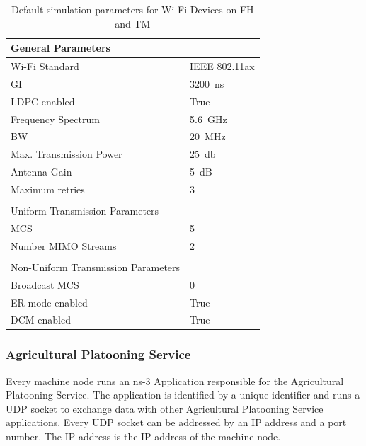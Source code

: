 \begin{table}[H]
   \centering
   \begin{tabular}{p{6cm}p{4cm}}
      General Parameters & \\
      \midrule
      Wi-Fi Standard & IEEE 802.11ax\\
      \ac{GI} & \SI{3200}{\nano\second}\\
      \ac{LDPC} enabled & True\\
      Frequency Spectrum & \SI{5.6}{\giga\hertz}\\
      \ac{BW} & \SI{20}{\mega\hertz}\\
      Max. Transmission Power & \SI{25}{\decibel}\\
      Antenna Gain & \SI{5}{\dB}\\
      Maximum retries & \num{3}\\
       & \\
      Uniform Transmission Parameters & \\
      \midrule
      \ac{MCS} & \num{5}\\
      Number \ac{MIMO} Streams & \num{2}\\
       & \\
      Non-Uniform Transmission Parameters & \\
      \midrule
      Broadcast \ac{MCS} & \num{0}\\
      \ac{ER} mode enabled & True\\
      \ac{DCM} enabled & True\\
   \end{tabular}
   \caption{Default simulation parameters for Wi-Fi Devices on \acf{FH} and \acf{TM}}
   \label{tab:SimulationParametersWiFi}
\end{table}

\subsubsection*{Agricultural Platooning Service}
Every machine node runs an ns-3 Application responsible for the Agricultural Platooning Service.
The application is identified by a unique identifier and runs a \ac{UDP} socket to exchange data with other Agricultural Platooning Service applications.
Every \ac{UDP} socket can be addressed by an IP address and a port number.
The IP address is the IP address of the machine node.

